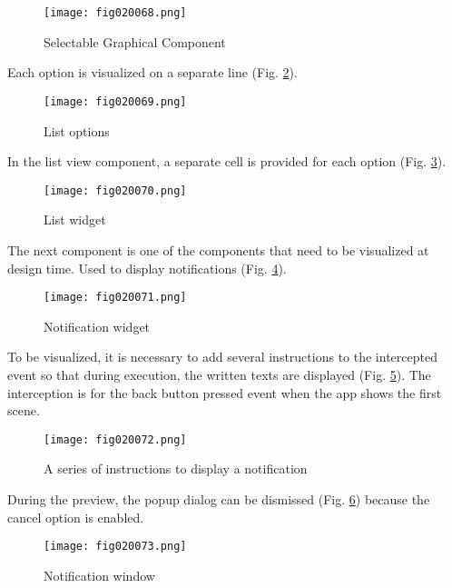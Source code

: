 \begin{figure}[H]
   \centering
   \texttt{[image: fig020068.png]}
   \caption{Selectable Graphical Component}
\label{fig020068}
\end{figure}

Each option is visualized on a separate line (Fig. \ref{fig020069}).

\begin{figure}[H]
   \centering
   \texttt{[image: fig020069.png]}
   \caption{List options}
\label{fig020069}
\end{figure}

In the list view component, a separate cell is provided for each option (Fig. \ref{fig020070}).

\begin{figure}[H]
   \centering
   \texttt{[image: fig020070.png]}
   \caption{List widget}
\label{fig020070}
\end{figure}

The next component is one of the components that need to be visualized at design time. Used to display notifications (Fig. \ref{fig020071}).

\begin{figure}[H]
   \centering
   \texttt{[image: fig020071.png]}
   \caption{Notification widget}
\label{fig020071}
\end{figure}

To be visualized, it is necessary to add several instructions to the intercepted event so that during execution, the written texts are displayed (Fig. \ref{fig020072}). The interception is for the back button pressed event when the app shows the first scene.

\begin{figure}[H]
   \centering
   \texttt{[image: fig020072.png]}
   \caption{A series of instructions to display a notification}
\label{fig020072}
\end{figure}

During the preview, the popup dialog can be dismissed (Fig. \ref{fig020073}) because the cancel option is enabled.

\begin{figure}[H]
   \centering
   \texttt{[image: fig020073.png]}
   \caption{Notification window}
\label{fig020073}
\end{figure}

